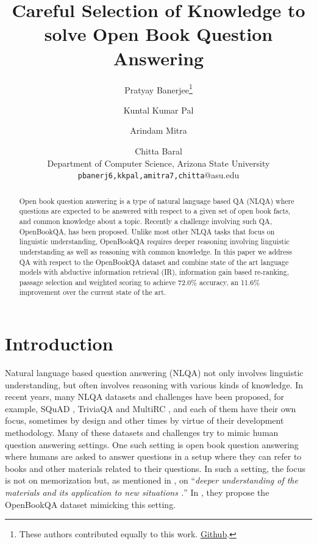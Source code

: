 \documentclass[11pt,a4paper]{article}
\title{Careful Selection of Knowledge to solve Open Book Question Answering}
\author{Pratyay Banerjee\thanks{\quad These authors contributed equally to this work. \href{http://github.com/ari9dam/OBQA}{Github}. } \and  Kuntal Kumar Pal\samethanks \and Arindam Mitra\samethanks \and Chitta Baral 
\\ Department of Computer Science, Arizona State University
\\ \texttt{pbanerj6,kkpal,amitra7,chitta}@asu.edu
}
\date{}
\begin{document}
\maketitle
\begin{abstract}

Open book question answering is a type of natural language based QA (NLQA) where questions are expected to be answered with respect to a given set of open book facts, and common knowledge about a topic. Recently a challenge involving such QA, OpenBookQA, 
has been proposed. Unlike most other NLQA tasks that focus on linguistic understanding, OpenBookQA requires deeper reasoning involving linguistic understanding as well as
reasoning with common knowledge. In this paper we address QA with respect to the OpenBookQA dataset and combine state of the art language models with abductive information retrieval (IR), information gain based re-ranking, passage selection and weighted scoring to achieve 72.0\% accuracy, an 11.6\% improvement over the current state of the art.
\end{abstract}

\section{Introduction}
Natural language based question answering (NLQA) not only involves linguistic understanding, but often involves reasoning with various kinds of knowledge. In recent years, many NLQA datasets and challenges have been proposed, for example, SQuAD \cite{rajpurkar2016squad}, TriviaQA \cite{joshi2017triviaqa} and MultiRC \cite{khashabi2018looking}, and each of them have their own focus, sometimes by design and other times by virtue of their development methodology. Many of these datasets and challenges try to mimic human question answering settings. One such setting is open book question answering where humans are asked to answer questions in a setup where they can refer to books and other materials related to their questions. In such a setting, the focus is not on memorization but, as mentioned in \citet{OpenBookQA2018}, on ``{\em deeper understanding of the materials and its application to new situations \cite{jenkins1995open,jlands1996}.}'' In \citet{OpenBookQA2018}, they propose the OpenBookQA dataset mimicking this setting. 
\end{document}
